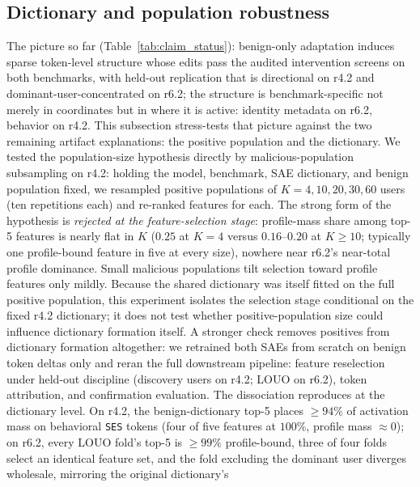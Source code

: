 \documentclass[10pt]{article} %
\newcommand{\rsix}{r6.2}
\newcommand{\rfour}{r4.2}
\begin{document}


\subsection{Dictionary and population robustness}
\label{sec:cross}

The picture so far (Table~\ref{tab:claim_status}): benign-only adaptation
induces sparse token-level structure whose edits pass the audited
intervention screens on both benchmarks, with held-out replication that is
directional on \rfour{} and dominant-user-concentrated on \rsix{}; the
structure is benchmark-specific not merely in coordinates but in where it is
active: identity metadata on \rsix{}, behavior on \rfour{}. This subsection stress-tests
that picture against the two remaining artifact explanations: the positive
population and the dictionary. We tested the population-size hypothesis directly by malicious-population
subsampling on \rfour{}: holding the model, benchmark, SAE dictionary, and
benign population fixed, we resampled positive populations of
$K=4,10,20,30,60$ users (ten repetitions each) and re-ranked features for
each. The strong form of the hypothesis is \emph{rejected at the
feature-selection stage}: profile-mass share among top-5 features
is nearly flat in $K$ ($0.25$ at $K{=}4$ versus $0.16$--$0.20$ at
$K\geq 10$; typically one profile-bound feature in five at every size),
nowhere near \rsix{}'s near-total profile dominance. Small malicious
populations tilt selection toward profile features only mildly. Because the
shared dictionary was itself fitted on the full positive population, this
experiment isolates the selection stage conditional on the fixed \rfour{}
dictionary; it does not test whether positive-population size could influence
dictionary formation itself. A stronger check removes positives from
dictionary formation altogether: we retrained both SAEs from scratch on
benign token deltas only and reran the full downstream pipeline: feature
reselection under held-out discipline (discovery users on \rfour{}; LOUO on
\rsix{}), token attribution, and confirmation evaluation. The dissociation
reproduces at the dictionary level. On \rfour{}, the benign-dictionary top-5
places $\geq 94\%$ of activation mass on behavioral \texttt{SES} tokens
(four of five features at $100\%$, profile mass $\approx 0$); on \rsix{},
every LOUO fold's top-5 is $\geq 99\%$ profile-bound, three of four folds
select an identical feature set, and the fold excluding the dominant user
diverges wholesale, mirroring the original dictionary's
\end{document}
